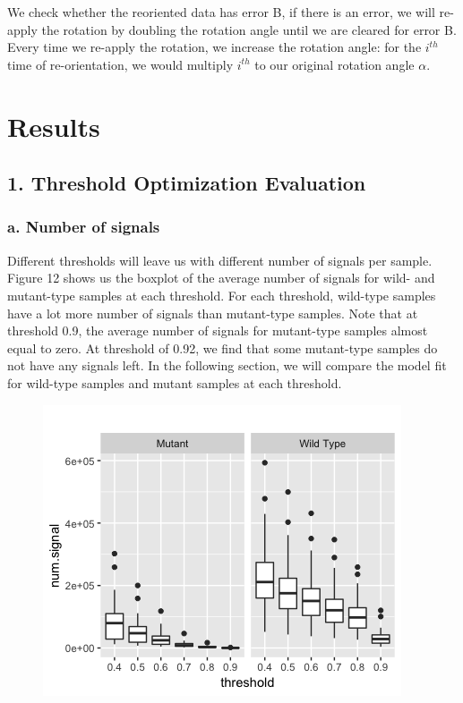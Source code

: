 \documentclass[10pt,letterpaper]{article}
\begin{document}
We check whether the reoriented data has error B, if there is an error,
we will re-apply the rotation by doubling the rotation angle until we
are cleared for error B. Every time we re-apply the rotation, we
increase the rotation angle: for the \(i^{th}\) time of re-orientation,
we would multiply \(i^{th}\) to our original rotation angle \(\alpha\).

\hypertarget{results}{%
\section{Results}\label{results}}

\hypertarget{threshold-optimization-evaluation}{%
\subsection{1. Threshold Optimization
Evaluation}\label{threshold-optimization-evaluation}}

\hypertarget{a.-number-of-signals}{%
\subsubsection{a. Number of signals}\label{a.-number-of-signals}}

Different thresholds will leave us with different number of signals per
sample. Figure 12 shows us the boxplot of the average number of signals
for wild- and mutant-type samples at each threshold. For each threshold,
wild-type samples have a lot more number of signals than mutant-type
samples. Note that at threshold 0.9, the average number of signals for
mutant-type samples almost equal to zero. At threshold of 0.92, we find
that some mutant-type samples do not have any signals left. In the
following section, we will compare the model fit for wild-type samples
and mutant samples at each threshold.

\begin{figure}[H]
\includegraphics[width=0.8\linewidth]{visualization_paper/thresh_numsig_boxplot} \end{figure}
\end{document}

